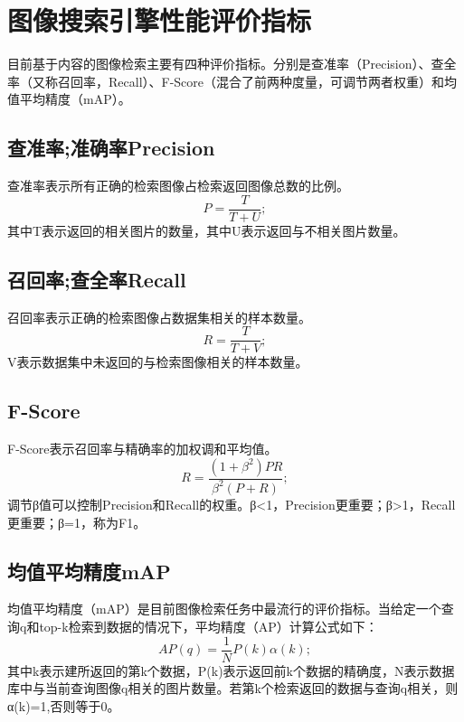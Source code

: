 \documentclass[bachelor_p]{hdu-thesis}
\begin{document}
\section{图像搜索引擎性能评价指标}

目前基于内容的图像检索主要有四种评价指标。分别是查准率（Precision）、查全率（又称召回率，Recall）、F-Score（混合了前两种度量，可调节两者权重）和均值平均精度（mAP）。

\subsection{查准率;准确率Precision}

查准率表示所有正确的检索图像占检索返回图像总数的比例。
\begin{equation}
  P = \frac{T}{T+U};
\end{equation}
其中T表示返回的相关图片的数量，其中U表示返回与不相关图片数量。

\subsection{召回率;查全率Recall}

召回率表示正确的检索图像占数据集相关的样本数量。
\begin{equation}
  R = \frac{T}{T+V};
\end{equation}
V表示数据集中未返回的与检索图像相关的样本数量。

\subsection{F-Score}

F-Score表示召回率与精确率的加权调和平均值。
\begin{equation}
  R = \frac{(1+\beta^2)PR}{\beta^2(P+R)};
\end{equation}
调节β值可以控制Precision和Recall的权重。β<1，Precision更重要；β>1，Recall更重要；β=1，称为F1。

\subsection{均值平均精度mAP}

均值平均精度（mAP）是目前图像检索任务中最流行的评价指标。当给定一个查询q和top-k检索到数据的情况下，平均精度（AP）计算公式如下：
\begin{equation}
  AP(q) = \frac{1}{N}P(k)\alpha(k);
\end{equation}
其中k表示建所返回的第k个数据，P(k)表示返回前k个数据的精确度，N表示数据库中与当前查询图像q相关的图片数量。若第k个检索返回的数据与查询q相关，则α(k)=1,否则等于0。
\end{document}
